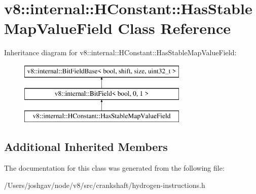 \hypertarget{classv8_1_1internal_1_1_h_constant_1_1_has_stable_map_value_field}{}\section{v8\+:\+:internal\+:\+:H\+Constant\+:\+:Has\+Stable\+Map\+Value\+Field Class Reference}
\label{classv8_1_1internal_1_1_h_constant_1_1_has_stable_map_value_field}
Inheritance diagram for v8\+:\+:internal\+:\+:H\+Constant\+:\+:Has\+Stable\+Map\+Value\+Field\+:\begin{figure}[H]
\begin{center}
\leavevmode
\includegraphics[height=3.000000cm]{classv8_1_1internal_1_1_h_constant_1_1_has_stable_map_value_field}
\end{center}
\end{figure}
\subsection*{Additional Inherited Members}


The documentation for this class was generated from the following file\+:\begin{DoxyCompactItemize}
\item 
/\+Users/joshgav/node/v8/src/crankshaft/hydrogen-\/instructions.\+h\end{DoxyCompactItemize}
